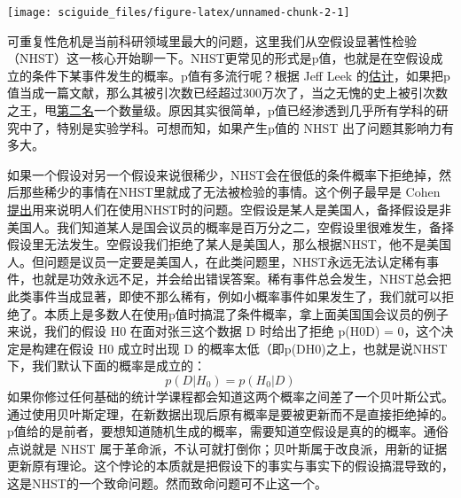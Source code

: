 \documentclass[]{tufte-book}
\begin{document}
\texttt{[image: sciguide\_files/figure-latex/unnamed-chunk-2-1]}

可重复性危机是当前科研领域里最大的问题，这里我们从空假设显著性检验（NHST）这一核心开始聊一下。NHST更常见的形式是p值，也就是在空假设成立的条件下某事件发生的概率。p值有多流行呢？根据 Jeff Leek 的\href{https://docs.google.com/presentation/d/1hzdSDaPPSE9xUYZHhOVfQIRPPdwe0A9SdE7QDsK3bOA/edit\#slide=id.g255a5ace66_3_796}{估计}，如果把p值当成一篇文献，那么其被引次数已经超过300万次了，当之无愧的史上被引次数之王，甩\href{http://www.nature.com/news/the-top-100-papers-1.16224}{第二名}一个数量级。原因其实很简单，p值已经渗透到几乎所有学科的研究中了，特别是实验学科。可想而知，如果产生p值的 NHST 出了问题其影响力有多大。

如果一个假设对另一个假设来说很稀少，NHST会在很低的条件概率下拒绝掉，然后那些稀少的事情在NHST里就成了无法被检验的事情。这个例子最早是 Cohen \href{http://ist-socrates.berkeley.edu/~maccoun/PP279_Cohen1.pdf}{提出}用来说明人们在使用NHST时的问题。空假设是某人是美国人，备择假设是非美国人。我们知道某人是国会议员的概率是百万分之二，空假设里很难发生，备择假设里无法发生。空假设我们拒绝了某人是美国人，那么根据NHST，他不是美国人。但问题是议员一定要是美国人，在此类问题里，NHST永远无法认定稀有事件，也就是功效永远不足，并会给出错误答案。稀有事件总会发生，NHST总会把此类事件当成显著，即使不那么稀有，例如小概率事件如果发生了，我们就可以拒绝了。本质上是多数人在使用p值时搞混了条件概率，拿上面美国国会议员的例子来说，我们的假设 H0 在面对张三这个数据 D 时给出了拒绝 p(H0\textbar D) = 0，这个决定是构建在假设 H0 成立时出现 D 的概率太低（即p(D\textbar H0)之上，也就是说NHST下，我们默认下面的概率是成立的：
\[
p(D|H_0) = p(H_0|D)
\]
如果你修过任何基础的统计学课程都会知道这两个概率之间差了一个贝叶斯公式。通过使用贝叶斯定理，在新数据出现后原有概率是要被更新而不是直接拒绝掉的。p值给的是前者，要想知道随机生成的概率，需要知道空假设是真的的概率。通俗点说就是 NHST 属于革命派，不认可就打倒你；贝叶斯属于改良派，用新的证据更新原有理论。这个悖论的本质就是把假设下的事实与事实下的假设搞混导致的，这是NHST的一个致命问题。然而致命问题可不止这一个。
\end{document}
